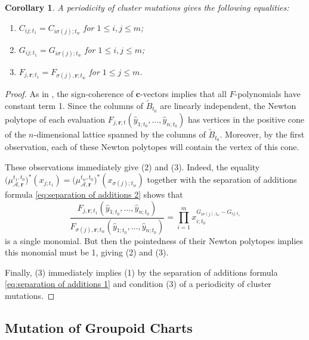 \documentclass{amsart}
\newtheorem{corollary}[theorem]{Corollary}
\numberwithin{equation}{section}
\newcommand{\bfc}{\mathbf{c}}
\newcommand{\bfr}{{\boldsymbol{r}}}
\newcommand{\cA}{\mathcal{A}}
\begin{document}
\begin{corollary}
  \label{cor:periodicity}
  A periodicity of cluster mutations gives the following equalities:
  \begin{enumerate}
    \item $C_{ij;t_1}=C_{i\sigma(j);t_w}$ for $1\le i,j\le m$;
    \item $G_{ij;t_1}=G_{i\sigma(j);t_w}$ for $1\le i,j\le m$;
    \item $F_{j,\bfr;t_1}=F_{\sigma(j),\bfr;t_w}$ for $1\le j\le m$.
  \end{enumerate}
\end{corollary}
\begin{proof}
  As in \cite[Proposition 5.6]{FZ07}, the sign-coherence of $\bfc$-vectors implies that all $F$-polynomials have constant term 1.
  Since the columns of $\tilde B_{t_0}$ are linearly independent, the Newton polytope of each evaluation $F_{j,\bfr;t}(\hat y_{1;t_0},\ldots,\hat y_{n;t_0})$ has vertices in the positive cone of the $n$-dimensional lattice spanned by the columns of $\tilde B_{t_0}$.
  Moreover, by the first observation, each of these Newton polytopes will contain the vertex of this cone.
  
  These observations immediately give (2) and (3).
  Indeed, the equality $\big(\mu_{\cA,\bfr}^{t_1,t_0}\big)^*(x_{j;t_1})=\big(\mu_{\cA,\bfr}^{t_w,t_0}\big)^*(x_{\sigma(j);t_w})$ together with the separation of additions formula \eqref{eq:separation of additions 2} shows that 
  \[\frac{F_{j,\bfr;t_1}(\hat y_{1;t_0},\ldots,\hat y_{n;t_0})}{F_{\sigma(j),\bfr;t_w}(\hat y_{1;t_0},\ldots,\hat y_{n;t_0})}=\prod_{i=1}^m x_{i;t_0}^{G_{i\sigma(j);t_w}-G_{ij;t_1}}\]
  is a single monomial.
  But then the pointedness of their Newton polytopes implies this monomial must be 1, giving (2) and (3).

  Finally, (3) immediately implies (1) by the separation of additions formula \eqref{eq:separation of additions 1} and condition (3) of a periodicity of cluster mutations.
\end{proof}


\subsection{Mutation of Groupoid Charts}
\label{sec:groupoid mutations}
\end{document}
